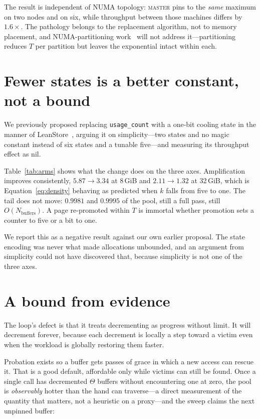 \documentclass[sigconf,nonacm]{acmart}
\begin{document}
The result is independent of NUMA topology: \textsc{master} pins to the
\emph{same} maximum on two nodes and on six, while throughput between those
machines differs by $1.6\times$. The pathology belongs to the replacement
algorithm, not to memory placement, and NUMA-partitioning
work~\cite{vondra_numa} will not address it---partitioning reduces $T$ per
partition but leaves the exponential intact within each.

\section{Fewer states is a better constant, not a bound}
\label{sec:onebit}

We previously proposed replacing \texttt{usage\_count} with a one-bit cooling
state in the manner of LeanStore~\cite{leanstore2018}, arguing it on
simplicity---two states and no magic constant instead of six states and a
tunable five---and measuring its throughput effect as nil.

Table~\ref{tab:arms} shows what the change does on the three axes.
Amplification improves consistently, $5.87 \rightarrow 3.34$ at 8\,GiB and
$2.11 \rightarrow 1.32$ at 32\,GiB, which is Equation~\ref{eq:density} behaving
as predicted when $k$ falls from five to one. The tail does not move: $0.9981$
and $0.9995$ of the pool, still a full pass, still
$O(N_{\text{buffers}})$. A page re-promoted within $T$ is immortal whether
promotion sets a counter to five or a bit to one.

We report this as a negative result against our own earlier proposal. The state
encoding was never what made allocations unbounded, and an argument from
simplicity could not have discovered that, because simplicity is not one of the
three axes.

\section{A bound from evidence}
\label{sec:bound}

The loop's defect is that it treats decrementing as progress without limit. It
will decrement forever, because each decrement is locally a step toward a
victim even when the workload is globally restoring them faster.

Probation exists so a buffer gets passes of grace in which a new access can
rescue it. That is a good default, affordable only while victims can still be
found. Once a single call has decremented $\Theta$ buffers without encountering
one at zero, the pool is \emph{observably} hotter than the hand can
traverse---a direct measurement of the quantity that matters, not a heuristic
on a proxy---and the sweep claims the next unpinned buffer:
\end{document}
